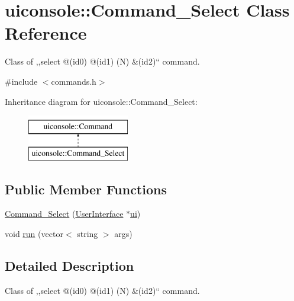 \hypertarget{classuiconsole_1_1Command__Select}{
\section{uiconsole::Command\_\-Select Class Reference}
\label{d4/dfe/classuiconsole_1_1Command__Select}
}


Class of ,,select @(id0) @(id1) (N) \&(id2)`` command.  




{\ttfamily \#include $<$commands.h$>$}

Inheritance diagram for uiconsole::Command\_\-Select:\begin{figure}[H]
\begin{center}
\leavevmode
\includegraphics[height=2.000000cm]{d4/dfe/classuiconsole_1_1Command__Select}
\end{center}
\end{figure}
\subsection*{Public Member Functions}
\begin{DoxyCompactItemize}
\item 
\hyperlink{classuiconsole_1_1Command__Select_a71479b0b684f8503b1caff3feebc44b5}{Command\_\-Select} (\hyperlink{classUserInterface}{UserInterface} $\ast$\hyperlink{classuiconsole_1_1Command_ab43ed5152860c099f858d62f9f556699}{ui})
\item 
void \hyperlink{classuiconsole_1_1Command__Select_ad3274b623f8cb12814fa2272ddece058}{run} (vector$<$ string $>$ args)
\end{DoxyCompactItemize}


\subsection{Detailed Description}
Class of ,,select @(id0) @(id1) (N) \&(id2)`` command. 

